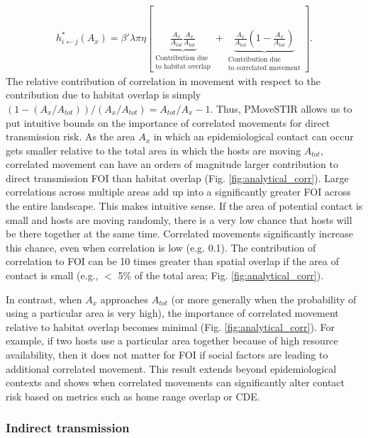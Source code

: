 \documentclass[letterpaper]{article}
\begin{document}
\begin{equation}
    \begin{aligned}
        h^*_{i \leftarrow j}(A_x) = \beta' \lambda \pi \eta \left[\underbrace{\frac{A_x}{A_{tot}}\frac{A_x}{A_{tot}}}_{\substack{\text{Contribution due} \\  \text{to habitat overlap}}} + \underbrace{\frac{A_x}{A_{tot}}(1 - \frac{A_x}{A_{tot}})}_{\substack{\text{Contribution due} \\ \text{to correlated movement}}} \right].
    \end{aligned}
    \label{eq:uniform_direct}
\end{equation}
The relative contribution of correlation in movement with respect to the contribution due to habitat overlap is simply $(1 - (A_x / A_{tot})) / (A_x / A_{tot})=A_{tot}/A_x-1$. 
Thus, PMoveSTIR allows us to put intuitive bounds on the importance of correlated movements for direct transmission risk. 
As the area $A_x$ in which an epidemiological contact can occur gets smaller relative to the total area in which the hosts are moving $A_{tot}$, correlated movement can have an orders of magnitude larger contribution to direct transmission FOI than habitat overlap (Fig. \ref{fig:analytical_corr}). Large correlations across multiple areas add up into a significantly greater FOI across the entire landscape. 
This makes intuitive sense. If the area of potential contact is small and hosts are moving randomly, there is a very low chance that hosts will be there together at the same time. Correlated movements significantly increase this chance, even when correlation is low (e.g. 0.1). The contribution of correlation to FOI can be 10 times greater than spatial overlap if the area of contact is small (e.g., $<$ 5\% of the total area; Fig. \ref{fig:analytical_corr}).

In contrast, when $A_x$ approaches $A_{tot}$ (or more generally when the probability of using a particular area is very high), the importance of correlated movement relative to habitat overlap becomes minimal (Fig. \ref{fig:analytical_corr}). For example, if two hosts use a particular area together because of high resource availability, then it does not matter for FOI if social factors are leading to additional correlated movement. This result extends beyond epidemiological contexts and shows when correlated movements can significantly alter contact risk based on metrics such as home range overlap or CDE.

\subsubsection*{Indirect transmission}
\end{document}
